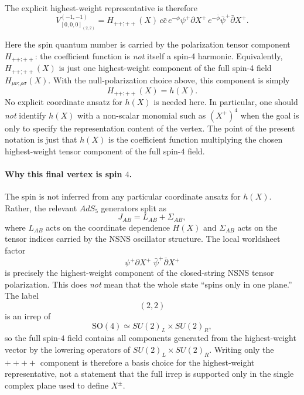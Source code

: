 \documentclass[12pt]{article}
\newcommand{\SO}{\mathrm{SO}}
\begin{document}
The explicit highest-weight representative is therefore
\begin{equation}
V^{(-1,-1)}_{[0,0,0]_{(2,2)}}
=H_{++;++}(X)\,
c\bar c\,
e^{-\phi}\psi^+\partial X^+\,
e^{-\bar\phi}\bar\psi^+\bar\partial X^+.
\end{equation}

Here the spin quantum number is carried by the polarization tensor component $H_{++;++}$:
the coefficient function is \emph{not} itself a spin-4 harmonic. Equivalently, $H_{++;++}(X)$
is just one highest-weight component of the full spin-4 field $H_{\mu\nu;\rho\sigma}(X)$.
With the null-polarization choice above, this component is simply
\begin{equation}
H_{++;++}(X)=h(X).
\end{equation}
No explicit coordinate ansatz for $h(X)$ is needed here. In particular, one should \emph{not}
identify $h(X)$ with a non-scalar monomial such as $(X^+)^4$ when the goal is only to specify the
representation content of the vertex. The point of the present notation is just that $h(X)$ is the
coefficient function multiplying the chosen highest-weight tensor component of the full spin-$4$ field.

\paragraph{Why this final vertex is spin $4$.}
The spin is not inferred from any particular coordinate ansatz for $h(X)$. Rather, the relevant
$AdS_5$ generators split as
\begin{equation}
J_{AB}=L_{AB}+\Sigma_{AB},
\end{equation}
where $L_{AB}$ acts on the coordinate dependence $H(X)$ and $\Sigma_{AB}$ acts on the tensor
indices carried by the NSNS oscillator structure. The local worldsheet factor
\begin{equation}
\psi^+\partial X^+\;\bar\psi^+\bar\partial X^+
\end{equation}
is precisely the highest-weight component of the closed-string NSNS tensor polarization.
This does \emph{not} mean that the whole state ``spins only in one plane.'' The label
\begin{equation}
(2,2)
\end{equation}
is an irrep of
\begin{equation}
\SO(4)\simeq SU(2)_L\times SU(2)_R,
\end{equation}
so the full spin-$4$ field contains all components generated from the highest-weight vector by the
lowering operators of $SU(2)_L\times SU(2)_R$. Writing only the $++++$ component is therefore a
basis choice for the highest-weight representative, not a statement that the full irrep is supported
only in the single complex plane used to define $X^\pm$.
\end{document}
